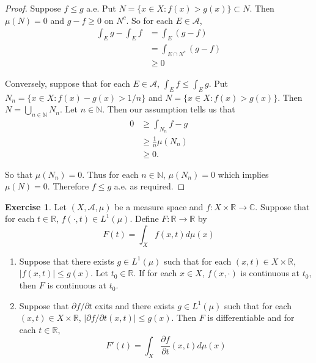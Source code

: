 \documentclass[12pt]{amsart}
\theoremstyle{definition}
\newtheorem{ex}[definition]{Exercise}
\newcommand{\C}{\mathbb{C}}
\newcommand{\N}{\mathbb{N}}
\newcommand{\R}{\mathbb{R}}
\newcommand{\MA}{\mathcal{A}}
\newcommand{\p}{\partial}
\newcommand{\lex}[1]{\label{ex:#1}}
\begin{document}
	\begin{proof}
		Suppose $f \leq g$ a.e. Put $N = \{x\in X: f(x) > g(x)\} \subset N$. Then $\mu(N) = 0$ and $g-f \geq 0$ on $N^c$. So for each $E \in \MA$,
		\begin{align*}
			\int_E g - \int_E f 
			&= \int_E (g-f)\\
			&= \int_{E \cap N^c} (g-f)\\
			& \geq 0
		\end{align*} 
		
		Conversely, suppose that for each $E \in \MA$, $\int_E f \leq \int_E g$. Put $N_n = \{x \in X: f(x) - g(x) > 1/n\}$ and $N = \{x \in X: f(x) > g(x)\}$. Then $N = \bigcup\limits_{n \in \N}N_n$. Let $n \in \N$. Then our assumption tells us that 
		\begin{align*}
			0 
			&\geq \int_{N_n} f-g\\
			& \geq \frac{1}{n} \mu(N_n)\\
			& \geq 0.
		\end{align*} 
		
		So that $\mu(N_n) = 0$. Thus for each $n \in \N$, $\mu(N_n) = 0$ which implies $\mu(N) = 0$. Therefore $f \leq g$ a.e. as required. 
	\end{proof}
	
	\begin{ex} \lex{00000} 
	Let $(X, \MA, \mu)$ be a measure space and $f:X \times \R \rightarrow \C$. Suppose that for each $t \in \R$, $f(\cdot, t) \in L^1(\mu)$. Define $F: \R \rightarrow \R$ by 
	$$F(t) = \int_X f(x, t) d\mu(x)$$ 
	\begin{enumerate}
	\item Suppose that there exists $g \in L^1(\mu)$ such that for each $(x, t) \in X \times \R$, $|f(x,t)| \leq g(x)$. Let $t_0 \in \R$. If for each $x \in X$, $f(x, \cdot)$ is continuous at $t_0$, then $F$ is continuous at $t_0$. 
 	\item Suppose that $\p f / \p t$ exits and there exists $g \in L^1(\mu)$ such that for each $(x, t) \in X \times \R$, $|\p f / \p t(x,t) | \leq g(x)$. Then $F$ is differentiable and for each $t \in \R$, $$F'(t) = \int_X \frac{\p f}{\p t}(x, t) d \mu(x)$$
	\end{enumerate}
	\end{ex}
	
\end{document}
